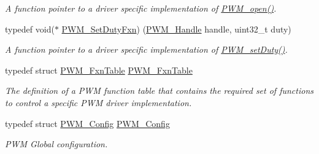 \begin{DoxyCompactItemize}
\begin{DoxyCompactList}\small\item\em A function pointer to a driver specific implementation of \hyperlink{_p_w_m_8h_ac963beab0c5c6901bf852f175028aeaf}{P\+W\+M\+\_\+open()}. \end{DoxyCompactList}\item 
typedef void($\ast$ \hyperlink{_p_w_m_8h_a4d729a443944bea99ae30cb09a0035ee}{P\+W\+M\+\_\+\+Set\+Duty\+Fxn}) (\hyperlink{_p_w_m_8h_afdefc765f42bbad4dca246fda6e1354b}{P\+W\+M\+\_\+\+Handle} handle, uint32\+\_\+t duty)
\begin{DoxyCompactList}\small\item\em A function pointer to a driver specific implementation of \hyperlink{_p_w_m_8h_a9b4c4b744af933d4f2678dc18b49bfb4}{P\+W\+M\+\_\+set\+Duty()}. \end{DoxyCompactList}\item 
typedef struct \hyperlink{struct_p_w_m___fxn_table}{P\+W\+M\+\_\+\+Fxn\+Table} \hyperlink{_p_w_m_8h_a05890cc4f17c4343ff0ee612561fe267}{P\+W\+M\+\_\+\+Fxn\+Table}
\begin{DoxyCompactList}\small\item\em The definition of a P\+W\+M function table that contains the required set of functions to control a specific P\+W\+M driver implementation. \end{DoxyCompactList}\item 
typedef struct \hyperlink{struct_p_w_m___config}{P\+W\+M\+\_\+\+Config} \hyperlink{_p_w_m_8h_a007c9e36d0b1afcff70e1f2201845236}{P\+W\+M\+\_\+\+Config}
\begin{DoxyCompactList}\small\item\em P\+W\+M Global configuration. \end{DoxyCompactList}\end{DoxyCompactItemize}
